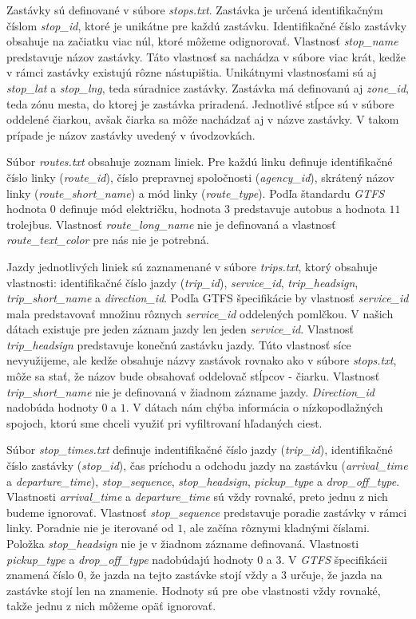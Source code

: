 Zastávky sú definované v súbore \textit{stops.txt}. Zastávka je určená identifikačným číslom \textit{stop\_id}, ktoré je unikátne pre každú zastávku. Identifikačné číslo zastávky obsahuje na začiatku viac núl, ktoré môžeme odignorovať. Vlastnosť \textit{stop\_name} predstavuje názov zastávky. Táto vlastnosť sa nachádza v súbore viac krát, kedže v rámci zastávky existujú rôzne nástupištia. Unikátnymi vlastnosťami sú aj \textit{stop\_lat} a \textit{stop\_lng}, teda súradnice zastávky. Zastávka má definovanú aj \textit{zone\_id}, teda zónu mesta, do ktorej je zastávka priradená. Jednotlivé stĺpce sú v súbore oddelené čiarkou, avšak čiarka sa môže nachádzať aj v názve zastávky. V takom prípade je názov zastávky uvedený v úvodzovkách.

Súbor \textit{routes.txt} obsahuje zoznam liniek. Pre každú linku definuje identifikačné číslo linky (\textit{route\_id}), číslo prepravnej spoločnosti (\textit{agency\_id}), skrátený názov linky (\textit{route\_short\_name}) a mód linky (\textit{route\_type}). Podľa štandardu \textit{GTFS} hodnota $0$ definuje mód električku, hodnota $3$ predstavuje autobus a hodnota $11$ trolejbus. Vlastnosť \textit{route\_long\_name} nie je definovaná a vlastnosť \textit{route\_text\_color} pre nás nie je potrebná.

Jazdy jednotlivých liniek sú zaznamenané v súbore \textit{trips.txt}, ktorý obsahuje vlastnosti: identifikačné číslo jazdy (\textit{trip\_id}), \textit{service\_id}, \textit{trip\_headsign}, \textit{trip\_short\_name} a \textit{direction\_id}. Podľa GTFS špecifikácie by vlastnosť \textit{service\_id} mala predstavovať množinu rôznych \textit{service\_id} oddelených pomlčkou. V našich dátach existuje pre jeden záznam jazdy len jeden \textit{service\_id}. Vlastnosť \textit{trip\_headsign} predstavuje konečnú zastávku jazdy. Túto vlastnosť síce nevyužijeme, ale kedže obsahuje názvy zastávok rovnako ako v súbore \textit{stops.txt}, môže sa stať, že názov bude obsahovať oddelovač stĺpcov - čiarku. Vlastnosť \textit{trip\_short\_name} nie je definovaná v žiadnom zázname jazdy. \textit{Direction\_id} nadobúda hodnoty $0$ a $1$. V dátach nám chýba informácia o nízkopodlažných spojoch, ktorú sme chceli využiť pri vyfiltrovaní hľadaných ciest.

Súbor \textit{stop\_times.txt} definuje indentifikačné číslo jazdy (\textit{trip\_id}), identifikačné číslo zastávky (\textit{stop\_id}), čas príchodu a odchodu jazdy na zastávku (\textit{arrival\_time} a \textit{departure\_time}), \textit{stop\_sequence}, \textit{stop\_headsign}, \textit{pickup\_type} a \textit{drop\_off\_type}. Vlastnosti \textit{arrival\_time} a \textit{departure\_time} sú vždy rovnaké, preto jednu z nich budeme ignorovať. Vlastnosť \textit{stop\_sequence} predstavuje poradie zastávky v rámci linky. Poradnie nie je iterované od $1$, ale začína rôznymi kladnými číslami. Položka \textit{stop\_headsign} nie je v žiadnom zázname definovaná. Vlastnosti \textit{pickup\_type} a \textit{drop\_off\_type} nadobúdajú hodnoty $0$ a $3$. V \textit{GTFS} špecifikácii znamená číslo $0$, že jazda na tejto zastávke stojí vždy a $3$ určuje, že jazda na zastávke stojí len na znamenie. Hodnoty sú pre obe vlastnosti vždy rovnaké, takže jednu z nich môžeme opäť ignorovať.


